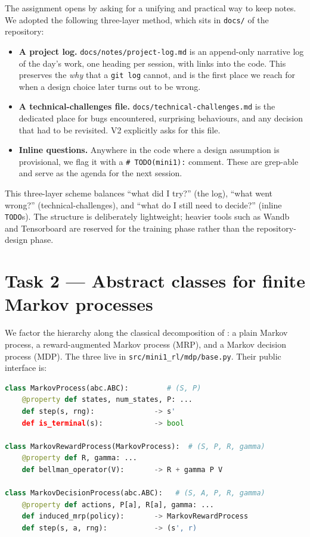 \documentclass[11pt]{article}
\begin{document}
The assignment opens by asking for a unifying and practical way to keep
notes. We adopted the following three-layer method, which sits in
\texttt{docs/} of the repository:
\begin{itemize}[leftmargin=2em, itemsep=2pt]
  \item \textbf{A project log.} \texttt{docs/notes/project-log.md} is an
    append-only narrative log of the day's work, one heading per
    session, with links into the code. This preserves the \emph{why}
    that a \texttt{git log} cannot, and is the first place we reach
    for when a design choice later turns out to be wrong.
  \item \textbf{A technical-challenges file.} \texttt{docs/technical-challenges.md}
    is the dedicated place for bugs encountered, surprising behaviours,
    and any decision that had to be revisited. V2 explicitly asks for
    this file.
  \item \textbf{Inline questions.} Anywhere in the code where a design
    assumption is provisional, we flag it with a \texttt{\# TODO(mini1):}
    comment. These are grep-able and serve as the agenda for the next
    session.
\end{itemize}
This three-layer scheme balances ``what did I try?'' (the log), ``what
went wrong?'' (technical-challenges), and ``what do I still need to
decide?'' (inline \texttt{TODO}s). The structure is deliberately
lightweight; heavier tools such as Wandb and Tensorboard
\citep{sutton2018} are reserved for the training phase rather than
the repository-design phase.

\section{Task 2 --- Abstract classes for finite Markov processes}
\label{sec:task2}

We factor the hierarchy along the classical decomposition of
\citet{sutton2018}: a plain Markov process, a reward-augmented Markov
process (MRP), and a Markov decision process (MDP). The three live in
\texttt{src/mini1\_rl/mdp/base.py}. Their public interface is:
\begin{lstlisting}[language=Python]
class MarkovProcess(abc.ABC):         # (S, P)
    @property def states, num_states, P: ...
    def step(s, rng):              -> s'
    def is_terminal(s):            -> bool

class MarkovRewardProcess(MarkovProcess):  # (S, P, R, gamma)
    @property def R, gamma: ...
    def bellman_operator(V):       -> R + gamma P V

class MarkovDecisionProcess(abc.ABC):   # (S, A, P, R, gamma)
    @property def actions, P[a], R[a], gamma: ...
    def induced_mrp(policy):       -> MarkovRewardProcess
    def step(s, a, rng):           -> (s', r)
\end{lstlisting}
\end{document}
